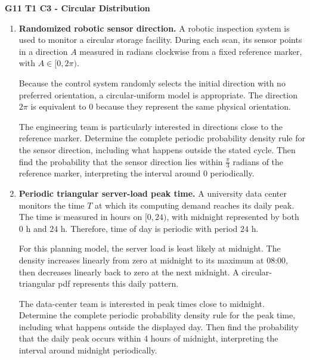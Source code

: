 	
	\vspace*{-15mm}
	
	\begin{center}
		{\large\bfseries G11 T1 C3 - Circular Distribution}
	\end{center}
	
	\vspace{-4mm}
	
	\begin{enumerate}[
		leftmargin=*,
		itemsep=2pt,
		parsep=0pt,
		topsep=2pt
		]
		

		\item \textbf{Randomized robotic sensor direction.} A robotic inspection
		system is used to monitor a circular storage facility. During each scan,
		its sensor points in a direction $A$ measured in radians clockwise from
		a fixed reference marker, with $A\in[0,2\pi)$.
		
		Because the control system randomly selects the initial direction with
		no preferred orientation, a circular-uniform model is appropriate. The
		direction $2\pi$ is equivalent to $0$ because they represent the same
		physical orientation.
		
		The engineering team is particularly interested in directions close to
		the reference marker. Determine the complete periodic probability density
		rule for the sensor direction, including what happens outside the stated
		cycle. Then find the probability that the sensor direction lies within
		$\frac{\pi}{3}$ radians of the reference marker, interpreting the interval
		around $0$ periodically.
		
		\item \textbf{Periodic triangular server-load peak time.} A university
		data center monitors the time $T$ at which its computing demand reaches
		its daily peak. The time is measured in hours on $[0,24)$, with midnight
		represented by both $0$ h and $24$ h. Therefore, time of day is periodic
		with period $24$ h.
		
		For this planning model, the server load is least likely at midnight.
		The density increases linearly from zero at midnight to its maximum at
		08:00, then decreases linearly back to zero at the next midnight. A
		circular-triangular pdf represents this daily pattern.
		
		The data-center team is interested in peak times close to midnight.
		Determine the complete periodic probability density rule for the peak
		time, including what happens outside the displayed day. Then find the
		probability that the daily peak occurs within 4 hours of midnight,
		interpreting the interval around midnight periodically.
		
	\end{enumerate}
	
